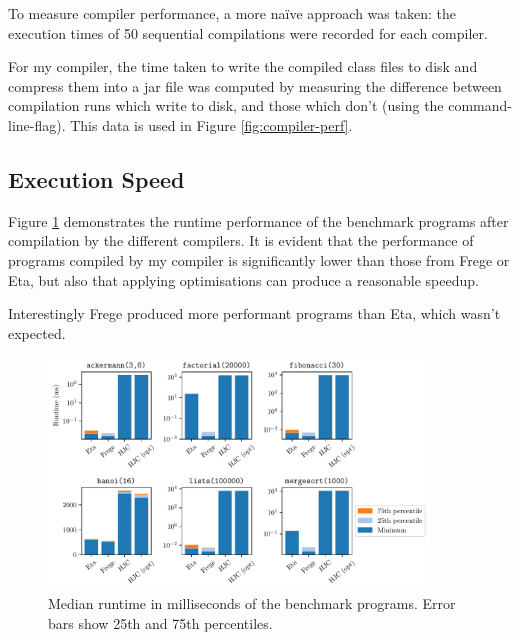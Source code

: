 \documentclass[dissertation.tex]{subfiles}
\begin{document}
{{        To measure compiler performance, a more naïve approach was taken: the execution times of 50 sequential
        compilations were recorded for each compiler.
        
        For my compiler, the time taken to write the compiled class files to disk and compress them into a jar file was
        computed by measuring the difference between compilation runs which write to disk, and those which don't (using
        the  command-line-flag). This data is used in Figure \ref{fig:compiler-perf}.

    }
    \subsection{Execution Speed}
    {

        Figure \ref{fig:perf} demonstrates the runtime performance of the benchmark programs after compilation by the
        different compilers. It is evident that the performance of programs compiled by my compiler is significantly
        lower than those from Frege or Eta, but also that applying optimisations can produce a reasonable speedup.

        Interestingly Frege produced more performant programs than Eta, which wasn't expected.

        \begin{figure}[h]
            \centering
            \captionsetup{width=0.8\textwidth}
            \includegraphics[width=0.9\textwidth]{graphs/perf.pdf}
            \caption{Median runtime in milliseconds of the benchmark programs. Error bars show 25th and 75th percentiles.}
            \label{fig:perf}
        
        \end{figure}

}}
\end{document}
